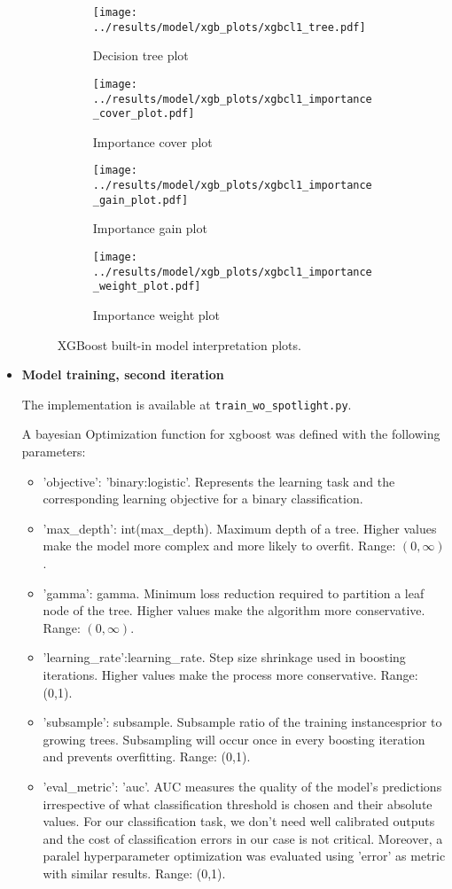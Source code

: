 \documentclass{article}
\begin{document}
\begin{itemize}
\begin{figure}
  \begin{subfigure}[a]{0.5\linewidth}
    \centering\texttt{[image: ../results/model/xgb\_plots/xgbcl1\_tree.pdf]}
    \caption{Decision tree plot}
    \label{fig:tree_spot}
  \end{subfigure}
  \begin{subfigure}[b]{0.5\linewidth}
    \centering\texttt{[image: ../results/model/xgb\_plots/xgbcl1\_importance\_cover\_plot.pdf]}
    \caption{Importance cover plot}
    \label{fig:cover_spot}
  \end{subfigure}
  \begin{subfigure}[c]{0.5\linewidth}
    \centering\texttt{[image: ../results/model/xgb\_plots/xgbcl1\_importance\_gain\_plot.pdf]}
    \caption{Importance gain plot}
    \label{fig:gain_spot}
  \end{subfigure}
  \begin{subfigure}[d]{0.5\linewidth}
    \centering\texttt{[image: ../results/model/xgb\_plots/xgbcl1\_importance\_weight\_plot.pdf]}
    \caption{Importance weight plot}
    \label{fig:weight_spot}
  \end{subfigure}
\caption{XGBoost built-in model interpretation plots.}
\label{fig:xgb_int_spot}
\end{figure}

\item \textbf{Model training, second iteration}

The implementation is available at {\tt train\_wo\_spotlight.py}.

A bayesian Optimization function for xgboost was defined with the following parameters:
\begin{itemize}
	\item 'objective': 'binary:logistic'. Represents the learning task and the corresponding learning objective for a binary classification.
	\item 'max\_depth': int(max\_depth). Maximum depth of a tree. Higher values make the model more complex and more likely to overfit. Range: $(0, \infty)$.
	\item 'gamma': gamma. Minimum loss reduction required to partition a leaf node of the tree. Higher values make the algorithm more conservative. Range: $(0, \infty)$.
	\item'learning\_rate':learning\_rate. Step size shrinkage used in boosting iterations. Higher values make the process more conservative. Range: (0,1).
	\item 'subsample': subsample. Subsample ratio of the training instancesprior to growing trees. Subsampling will occur once in every boosting iteration and prevents overfitting. Range: (0,1).
	\item 'eval\_metric': 'auc'. AUC measures the quality of the model's predictions irrespective of what classification threshold is chosen and their absolute values. For our classification task, we don't need well calibrated outputs and the cost of classification errors in our case is not critical. Moreover, a paralel hyperparameter optimization was evaluated using 'error' as metric with similar results. Range: (0,1).


\end{itemize}
\end{itemize}
\end{document}
